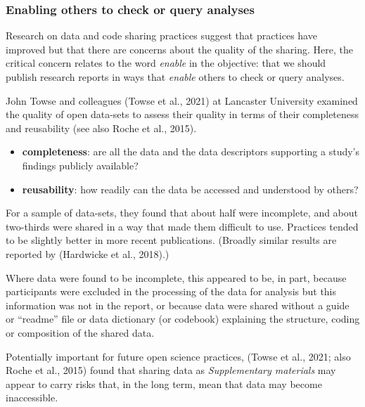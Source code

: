 \documentclass[
  letterpaper,
  DIV=11,
  numbers=noendperiod]{scrreprt}
\providecommand{\tightlist}{%
  \setlength{\itemsep}{0pt}\setlength{\parskip}{0pt}}\usepackage{longtable,booktabs,array}
\begin{document}
\hypertarget{sec-checkanalyses}{%
\subsubsection{Enabling others to check or query
analyses}\label{sec-checkanalyses}}

Research on data and code sharing practices suggest that practices have
improved but that there are concerns about the quality of the sharing.
Here, the critical concern relates to the word \emph{enable} in the
objective: that we should publish research reports in ways that
\emph{enable} others to check or query analyses.

John Towse and colleagues (Towse et al., 2021) at Lancaster University
examined the quality of open data-sets to assess their quality in terms
of their completeness and reusability (see also Roche et al., 2015).

\begin{itemize}
\tightlist
\item
  \textbf{completeness}: are all the data and the data descriptors
  supporting a study's findings publicly available?
\item
  \textbf{reusability}: how readily can the data be accessed and
  understood by others?
\end{itemize}

For a sample of data-sets, they found that about half were incomplete,
and about two-thirds were shared in a way that made them difficult to
use. Practices tended to be slightly better in more recent publications.
(Broadly similar results are reported by (Hardwicke et al., 2018).)

Where data were found to be incomplete, this appeared to be, in part,
because participants were excluded in the processing of the data for
analysis but this information was not in the report, or because data
were shared without a guide or ``readme'' file or data dictionary (or
codebook) explaining the structure, coding or composition of the shared
data.

Potentially important for future open science practices, (Towse et al.,
2021; also Roche et al., 2015) found that sharing data as
\emph{Supplementary materials} may appear to carry risks that, in the
long term, mean that data may become inaccessible.
\end{document}
